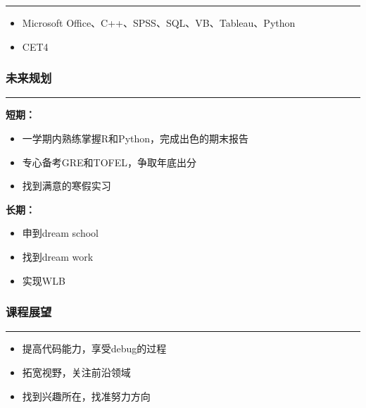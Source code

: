 \documentclass[
]{article}
\providecommand{\tightlist}{%
  \setlength{\itemsep}{0pt}\setlength{\parskip}{0pt}}
\begin{document}
\begin{center}\rule{0.5\linewidth}{0.5pt}\end{center}

\begin{itemize}
\tightlist
\item
  Microsoft Office、C++、SPSS、SQL、VB、Tableau、Python
\item
  CET4
\end{itemize}

\hypertarget{ux672aux6765ux89c4ux5212}{%
\subsubsection{未来规划}\label{ux672aux6765ux89c4ux5212}}

\begin{center}\rule{0.5\linewidth}{0.5pt}\end{center}

\textbf{短期：}

\begin{itemize}
\tightlist
\item
  一学期内熟练掌握R和Python，完成出色的期末报告
\item
  专心备考GRE和TOFEL，争取年底出分
\item
  找到满意的寒假实习
\end{itemize}

\textbf{长期：}

\begin{itemize}
\tightlist
\item
  申到dream school
\item
  找到dream work
\item
  实现WLB
\end{itemize}

\hypertarget{ux8bfeux7a0bux5c55ux671b}{%
\subsubsection{课程展望}\label{ux8bfeux7a0bux5c55ux671b}}

\begin{center}\rule{0.5\linewidth}{0.5pt}\end{center}

\begin{itemize}
\tightlist
\item
  提高代码能力，享受debug的过程
\item
  拓宽视野，关注前沿领域
\item
  找到兴趣所在，找准努力方向
\end{itemize}
\end{document}
